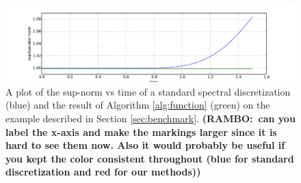\documentclass[final,leqno]{siamltex1213}
\newcommand{\ram}[1]{{\normalsize{\textbf{({\color{red}RAMBO:\ }#1)}}}}
\begin{document}
\begin{figure}[h]
	\hspace*{-1.2cm}
	\includegraphics[width=1.15\textwidth]{./images/L_inf_plot.pdf}
	\caption{A plot of the sup-norm vs time of a standard spectral discretization (blue) and the result of Algorithm \ref{alg:function} (green) on the example described in Section \ref{sec:benchmark}. \ram{can you label the x-axis and make the markings larger since it is hard to see them now. Also it would probably be useful if you kept the color consistent throughout (blue for standard discretization and red for our methods)}}
	\label{fig:norms}
\end{figure}
\end{document}
